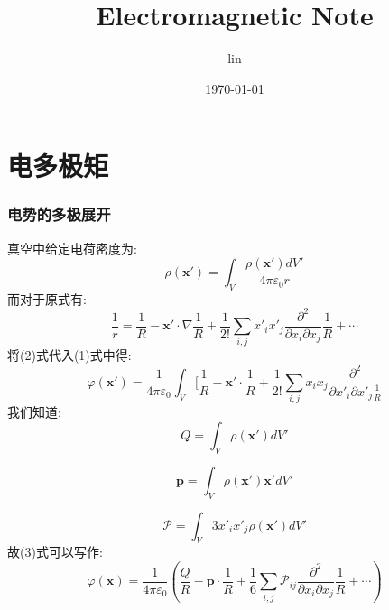 \documentclass{ctexart}
\title{Electromagnetic Note}
\author{lin}
\date{\today}
\begin{document}
\maketitle
\part{电多极矩}
\section{电势的多极展开}
真空中给定电荷密度为:
\begin{equation}
    \rho{(\mathbf{x'})}=\int_{V}\frac{\rho{(\mathbf{x'})}dV'}{4\pi\varepsilon_{0}r}
\end{equation}
而对于原式有:
\begin{equation}
    \frac{1}{r}=\frac{1}{R}-\mathbf{x'}\cdot\nabla\frac{1}{R}+\frac{1}{2!}\sum_{i,j}x'_{i}x'_{j}\frac{\partial^2}{\partial x_{i}\partial x_{j}}
\frac{1}{R}+\cdots
\end{equation}
将(2)式代入(1)式中得:
\begin{equation}
    \varphi{(\mathbf{x'})} = \frac{1}{4\pi\varepsilon_{0}}\int_{V}[\frac{1}{R}-\mathbf{x'}\cdot\frac{1}{R}+\frac{1}{2!}\sum_{i,j}x_{i}x_{j}\frac{\partial^2}{\partial x'_{i}\partial x'_{j}\frac{1}{R}}
\end{equation}
我们知道:
\begin{equation}
Q=\int_{V}\rho(\mathbf{x'})dV'
\end{equation}

\begin{equation}
\mathbf{p}=\int_{V}\rho(\mathbf{x'})\mathbf{x'}dV'
\end{equation}

\begin{equation}
\mathcal{P}=\int_{V}3x'_{i}x'_{j}\rho(\mathbf{x'})dV'
\end{equation}
故(3)式可以写作:
\begin{equation}
    \varphi(\mathbf{x})=\frac{1}{4\pi\varepsilon_{0}}(\frac{Q}{R}-\mathbf{p}\cdot\frac{1}{R}+\frac{1}{6}\sum_{i,j}\mathcal{P}_{ij}\frac{\partial^2}{\partial x_{i}\partial x_{j}}\frac{1}{R}+\cdots)
\end{equation}
\end{document}
